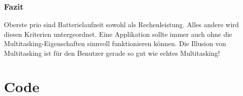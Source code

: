 \documentclass[a4paper,10pt]{scrreprt}
\begin{document}
\section{Fazit}
Oberste prio sind Batterielaufzeit sowohl als Rechenleistung. Alles andere wird diesen Kriterien untergeordnet. 
Eine Applikation sollte immer auch ohne die Multitasking-Eigenschaften sinnvoll funktionieren können.
Die Illusion von Multitasking ist für den Benutzer gerade so gut wie echtes Multitasking!
\part{Code}
\end{document}
